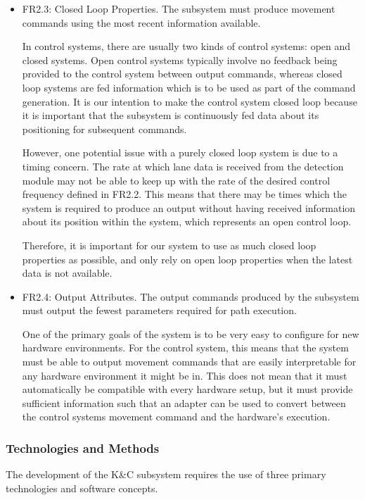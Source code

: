 \documentclass[titlepage,draft]{article}
\begin{document}
{\begin{itemize}
	\item FR2.3: Closed Loop Properties.
	      The subsystem must produce movement commands using the most recent information available.

	      In control systems, there are usually two kinds of control systems: open and closed systems. Open control systems typically involve no feedback being provided to the control system between output commands, whereas closed loop systems are fed information which is to be used as part of the command generation. It is our intention to make the control system closed loop because it is important that the subsystem is continuously fed data about its positioning for subsequent commands.

	      However, one potential issue with a purely closed loop system is due to a timing concern. The rate at which lane data is received from the detection module may not be able to keep up with the rate of the desired control frequency defined in FR2.2. This means that there may be times which the system is required to produce an output without having received information about its position within the system, which represents an open control loop.

	      Therefore, it is important for our system to use as much closed loop properties as possible, and only rely on open loop properties when the latest data is not available.

	\item FR2.4: Output Attributes. The output commands produced by the subsystem must output the fewest parameters required for path execution.

	      One of the primary goals of the system is to be very easy to configure for new hardware environments. For the control system, this means that the system must be able to output movement commands that are easily interpretable for any hardware environment it might be in. This does not mean that it must automatically be compatible with every hardware setup, but it must provide sufficient information such that an adapter can be used to convert between the control systems movement command and the hardware's execution.
\end{itemize}


\subsubsection{Technologies and Methods}
The development of the K\&C subsystem requires the use of three primary technologies and software concepts.

}
\end{document}
